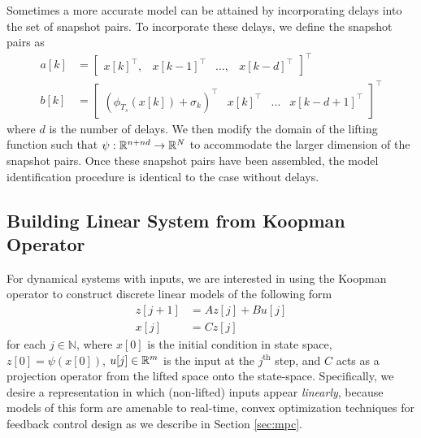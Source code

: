 Sometimes a more accurate model can be attained by incorporating delays into the set of snapshot pairs. 
To incorporate these delays, we define the snapshot pairs as
\begin{align}
    a[k] &= \begin{bmatrix} x[k]^\top, & x[k-1]^\top & \ldots, & x[k-d]^\top \end{bmatrix}^\top \label{eq:snapd1} \\
    b[k] &= \begin{bmatrix} \left( \phi_{T_s} (x[k]) + \sigma_k \right)^\top & x[k]^\top & \ldots & x[k-d+1]^\top \end{bmatrix}^\top \label{eq:snapd2}
\end{align}
where $d$ is the number of delays.
We then modify the domain of the lifting function such that $\psi : \mathbb{R}^{n+nd} \to \mathbb{R}^{N}$ to accommodate the larger dimension of the snapshot pairs.
Once these snapshot pairs have been assembled, the model identification procedure is identical to the case without delays.

\subsection{Building Linear System from Koopman Operator}

For dynamical systems with inputs, we are interested in using the Koopman operator to construct discrete linear models of the following form
\begin{equation}
\begin{aligned}
    z[j+1] &= A z[j] + B u[j] \\
    x[j] &= C z[j]
    \label{eq:linSys}
\end{aligned}
\end{equation}
for each $j \in \mathbb{N}$, where $x[0]$ is the initial condition in state space, $z[0] = \psi(x[0])$, $u[j] \in \mathbb{R}^m$ is the input at the $j^{\text{th}}$ step, and $C$ acts as a projection operator from the lifted space onto the state-space.
Specifically, we desire a representation in which (non-lifted) inputs appear \emph{linearly}, because models of this form are amenable to real-time, convex optimization techniques for feedback control design as we describe in Section \ref{sec:mpc}.

